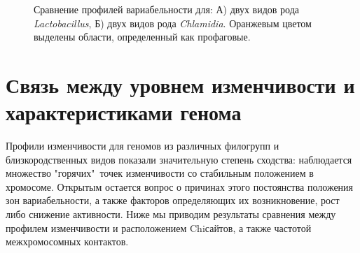 \begin{figure}[!ht] 
  \center
  \caption{Сравнение профилей вариабельности для: А) двух видов рода \textit{Lactobacillus}, Б) двух видов рода \textit{Chlamidia}. Оранжевым цветом выделены области, определенный как профаговые.}
  \label{img:species_complex_lactobacillus_chlam} 
\end{figure}







\section{Связь между уровнем изменчивости и характеристиками генома}\label{chaptComplexWithSMTH}

Профили изменчивости для геномов из различных филогрупп и близкородственных видов показали значительную степень сходства: наблюдается множество "горячих"\ точек изменчивости со стабильным положением в хромосоме. Открытым остается вопрос о причинах этого постоянства положения зон вариабельности, а также факторов определяющих их возникновение, рост либо снижение активности. Ниже мы приводим результаты сравнения между профилем изменчивости и расположением Chi\-сайтов, а также частотой межхромосомных контактов. 

